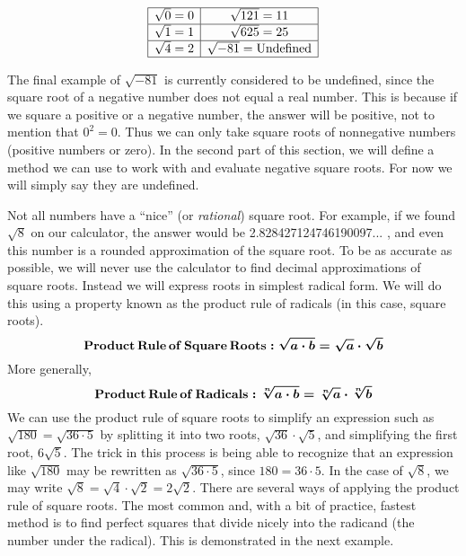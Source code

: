 \begin{example}
  \[ \begin{array}{|c|c|}
       \hline
       \sqrt{0} = 0 & \sqrt{121} = 11\\
       \hline
       \sqrt{1} = 1 & \sqrt{625} = 25\\
       \hline
       \sqrt{4} = 2 & \sqrt{- 81} = \operatorname{Undefined}\\
       \hline
     \end{array} \]
\end{example}

The final example of $\sqrt{- 81}$ is currently considered to be undefined, since the square root of a negative number does not equal a real number. This is because if we square a positive or a negative number, the answer
will be positive, not to mention that $0^2=0$. Thus we can only take square roots of nonnegative numbers (positive numbers or zero).  In the second part of this section, we will define a method we can use to work with and evaluate
negative square roots.  For now we will simply say they are undefined.\pp

Not all numbers have a ``nice'' (or \textit{rational}) square root. For example, if we found
$\sqrt{8}$ on our calculator, the answer would be
2.828427124746190097...%
, and even this number is a rounded
approximation of the square root. To be as accurate as possible, we will never
use the calculator to find decimal approximations of square roots. Instead we
will express roots in simplest radical form. We will do this using a property
known as the product rule of radicals (in this case, square roots).
\[ \boldsymbol{\operatorname{Product} \operatorname{Rule} \operatorname{of} \operatorname{Square} \operatorname{Roots} :
   \sqrt{a \cdot b} = \sqrt{a} \cdot \sqrt{b}} \]
More generally,
\[ \boldsymbol{\operatorname{Product} \operatorname{Rule} \operatorname{of} \operatorname{Radicals} :
   \sqrt[n]{a \cdot b} = \sqrt[n]{a} \cdot \sqrt[n]{b}} \]
We can use the product rule of square roots to simplify an expression such as $\sqrt{180}=\sqrt{36 \cdot
5}$ by splitting it into two roots, $\sqrt{36} \cdot \sqrt{5}$, and simplifying
the first root, $6 \sqrt{5}$. The trick in this process is being able to
recognize that an expression like $\sqrt{180}$ may be rewritten as $\sqrt{36 \cdot 5}$, since $180=36\cdot 5$. In the case of $\sqrt{8}$, we may write $\sqrt{8}=\sqrt{4}\cdot\sqrt{2}=2\sqrt{2}$.\pp
There are several ways of applying the product rule of square roots. The most common and, with a bit of practice,
fastest method is to find perfect squares that divide nicely into the
radicand (the number under the radical). This is demonstrated in the next example.

